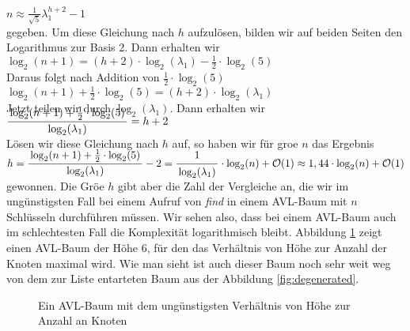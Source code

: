 \hspace*{1.3cm} $n \approx \displaystyle \frac{1}{\sqrt{5}} \lambda_1^{h+2} - 1$ \\[0.2cm]
gegeben.  Um diese Gleichung nach $h$ aufzul\"osen, bilden wir auf beiden Seiten den
Logarithmus zur Basis 2.  Dann erhalten wir 
\\[0.2cm]
\hspace*{1.3cm}
$\log_2(n+1) = (h+2) \cdot \log_2(\lambda_1) - \frac{1}{2}\cdot \log_2(5)$
\\[0.2cm]
Daraus folgt nach Addition von $\frac{1}{2}\cdot \log_2(5)$
\\[0.2cm]
\hspace*{1.3cm}
$\log_2(n+1) + \frac{1}{2}\cdot \log_2(5) = (h+2) \cdot \log_2(\lambda_1)$
\\[0.2cm]
Jetzt teilen wir durch $\log_2(\lambda_1)$.  Dann erhalten wir 
\\[0.4cm]
\hspace*{1.3cm}
$\displaystyle \bruch{\log_2(n+1) + \frac{1}{2}\cdot \log_2(5)}{\log_2(\lambda_1)} = h+2$
\\[0.2cm]
L\"osen wir diese Gleichung nach $h$ auf, so haben wir f\"ur gro\3e $n$
das Ergebnis
\\[0.4cm]
\hspace*{0.3cm} 
$h = \displaystyle \bruch{\log_2(n+1) + \frac{1}{2}\cdot \log_2(5)}{\log_2(\lambda_1)} - 2 =
      \bruch{1}{\log_2(\lambda_1)}\cdot \log_2(n) + \Oh(1) \approx 1,44 \cdot \log_2(n) + \Oh(1)$ 
\\[0.2cm]
gewonnen. 
Die Gr\"o\3e $h$ gibt aber die Zahl der Vergleiche an, die wir im ung\"unstigsten Fall bei
einem Aufruf von \textsl{find} in einem AVL-Baum mit $n$ Schl\"usseln durchf\"uhren m\"ussen.
Wir sehen also, dass bei einem AVL-Baum auch im schlechtesten Fall die Komplexit\"at
logarithmisch bleibt.  Abbildung
\ref{fig:avl-worst-case} zeigt einen AVL-Baum der H\"ohe 6, f\"ur den das Verh\"altnis von H\"ohe zur Anzahl
der Knoten maximal wird.  Wie man sieht ist auch dieser Baum noch sehr weit weg von dem
zur Liste entarteten Baum aus der Abbildung \ref{fig:degenerated}.


\begin{figure}[!ht]
  \centering
  \caption{Ein AVL-Baum mit dem ung\"unstigsten Verh\"altnis von H\"ohe zur Anzahl an Knoten}
  \label{fig:avl-worst-case}
\end{figure}
\pagebreak
\vspace*{\fill}

\pagebreak


